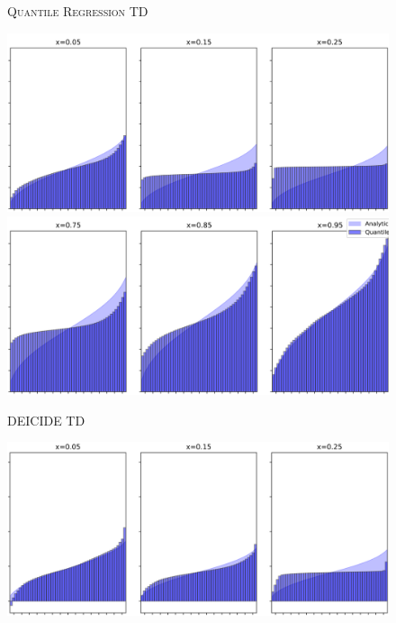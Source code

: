 \begin{figure}[h]
  \centering
  \newcommand{\munosscanscaledt}{0.73}
  \newcommand{\munosscanscalect}{0.73}
  \textsc{Quantile Regression TD}\\
  \begin{minipage}[t]{0.495\linewidth}
    \includegraphics[scale=\munosscanscaledt]{results/dt51-munos-scan-left}
  \end{minipage}%
  \begin{minipage}[t]{0.495\linewidth}
    \centering
    \includegraphics[scale=\munosscanscaledt]{results/dt51-munos-scan-right}
  \end{minipage}
  \textsc{DEICIDE TD}\\
  \begin{minipage}[t]{0.495\linewidth}
    \includegraphics[scale=\munosscanscalect]{results/ct51-munos-scan-left}

\end{minipage}
\end{figure}

